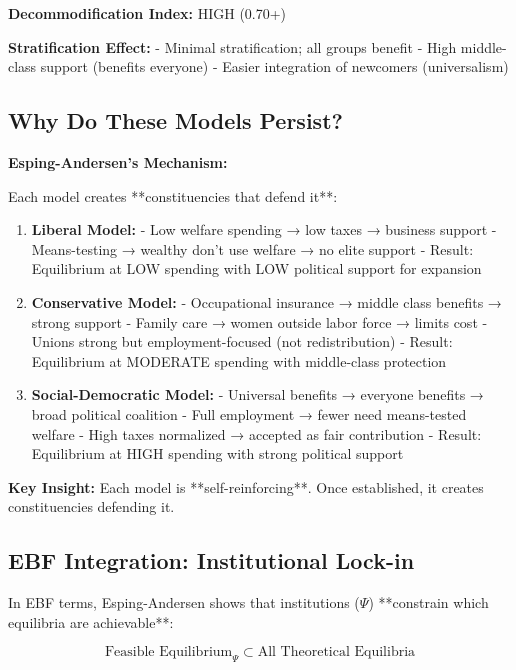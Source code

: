 \textbf{Decommodification Index:} HIGH (0.70+)

\textbf{Stratification Effect:}
- Minimal stratification; all groups benefit
- High middle-class support (benefits everyone)
- Easier integration of newcomers (universalism)

\subsection{Why Do These Models Persist?}

\textbf{Esping-Andersen's Mechanism:}

Each model creates **constituencies that defend it**:

\begin{enumerate}

\item \textbf{Liberal Model:}
   - Low welfare spending → low taxes → business support
   - Means-testing → wealthy don't use welfare → no elite support
   - Result: Equilibrium at LOW spending with LOW political support for expansion

\item \textbf{Conservative Model:}
   - Occupational insurance → middle class benefits → strong support
   - Family care → women outside labor force → limits cost
   - Unions strong but employment-focused (not redistribution)
   - Result: Equilibrium at MODERATE spending with middle-class protection

\item \textbf{Social-Democratic Model:}
   - Universal benefits → everyone benefits → broad political coalition
   - Full employment → fewer need means-tested welfare
   - High taxes normalized → accepted as fair contribution
   - Result: Equilibrium at HIGH spending with strong political support

\end{enumerate}

\textbf{Key Insight:} Each model is **self-reinforcing**. Once established, it creates constituencies defending it.

\subsection{EBF Integration: Institutional Lock-in}

In EBF terms, Esping-Andersen shows that institutions ($\Psi$) **constrain which equilibria are achievable**:

\begin{equation}
\text{Feasible Equilibrium}_{\Psi} \subset \text{All Theoretical Equilibria}
\end{equation}

